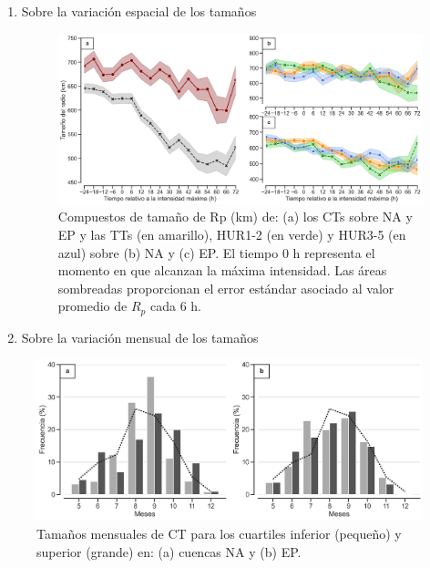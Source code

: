 \begin{frame}
    \begin{enumerate}
    \setcounter{enumi}{0}
    \item Sobre la variación espacial de los tamaños
    \begin{figure}
        \centering
        \includegraphics[scale = 0.26]{Images/Figures/Fig_3_8.jpeg}
        \caption{Compuestos de tamaño de Rp (km) de: (a) los CTs sobre {\red NA} y {\gray EP} y las TTs (en amarillo), HUR1-2 (en verde) y HUR3-5 (en azul) sobre (b) {\red NA} y (c) {\gray EP}. El tiempo 0 h representa el momento en que alcanzan la máxima intensidad. Las áreas sombreadas proporcionan el error estándar asociado al valor promedio de $R_p$ cada 6 h.}
        \label{fig:fig_11}
    \end{figure}
    \end{enumerate}
\end{frame}

\begin{frame}
    \begin{enumerate}
    \setcounter{enumi}{1}
        \item Sobre la variación mensual de los tamaños
    \end{enumerate}
    \begin{figure}
        \centering
        \includegraphics[scale = 0.3]{Images/Figures/Fig_3_10.jpeg}
        \caption{Tamaños mensuales de CT para los cuartiles inferior (pequeño) y superior (grande) en: (a) cuencas {\red NA} y (b) {\gray EP}.}
        \label{fig:fig_12}
    \end{figure}
\end{frame}

